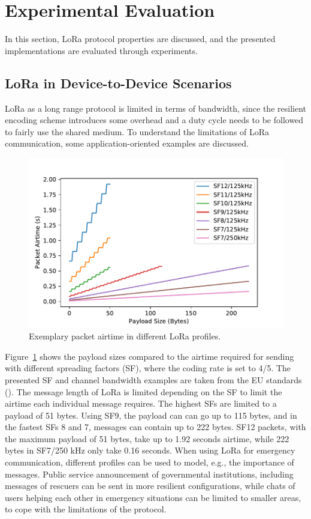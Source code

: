\section{Experimental Evaluation}
\label{hoechst2020lora:sec:eval}

In this section, LoRa protocol properties are discussed, and the presented implementations are evaluated through experiments.

\subsection{LoRa in Device-to-Device Scenarios}
LoRa as a long range protocol is limited in terms of bandwidth, since the resilient encoding scheme introduces some overhead and a duty cycle needs to be followed to fairly use the shared medium.
To understand the limitations of LoRa communication, some application-oriented examples are discussed.

\begin{figure}[ht!]
    \centering
    \includegraphics[width=.8\columnwidth]{gfx/lora-airtime.pdf}
    \caption{Exemplary packet airtime in different LoRa profiles.}
    \label{hoechst2020lora:fig:lora-airtime}
\end{figure}

Figure~\ref{hoechst2020lora:fig:lora-airtime} shows the payload sizes compared to the airtime required for sending with different spreading factors (SF), where the coding rate is set to 4/5.
The presented SF and channel bandwidth examples are taken from the EU standards (\cite{alliance2016lorawan}).
The message length of LoRa is limited depending on the SF to limit the airtime each individual message requires. 
The highest SFs are limited to a payload of 51 bytes. Using SF9, the payload can can go up to 115 bytes, and in the fastest SFs 8 and 7, messages can contain up to 222 bytes. 
SF12 packets, with the maximum payload of 51 bytes, take up to 1.92 seconds airtime, while 222 bytes in SF7/250 kHz only take 0.16 seconds.
When using LoRa for emergency communication, different profiles can be used to model, e.g., the importance of messages. 
Public service announcement of governmental institutions, including messages of rescuers can be sent in more resilient configurations, while chats of users helping each other in emergency situations can be limited to smaller areas, to cope with the limitations of the protocol.


